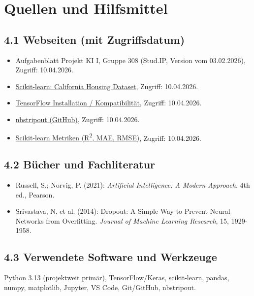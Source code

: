 \documentclass[11pt,a4paper,ngerman,openany]{report}
\begin{document}
\newpage

\section{Quellen und Hilfsmittel}

\small
\subsection*{4.1 Webseiten (mit Zugriffsdatum)}
\begin{itemize}[leftmargin=*,itemsep=0.05em,topsep=0.05em]
    \item [W1] Aufgabenblatt Projekt KI I, Gruppe 308 (Stud.IP, Version vom 03.02.2026), Zugriff: 10.04.2026.
    \item [W2] \href{https://scikit-learn.org/stable/modules/generated/sklearn.datasets.fetch_california_housing.html}{Scikit-learn: California Housing Dataset}, Zugriff: 10.04.2026.
    \item [W3] \href{https://www.tensorflow.org/install/pip}{TensorFlow Installation / Kompatibilit\"at}, Zugriff: 10.04.2026.
    \item [W4] \href{https://github.com/kynan/nbstripout}{nbstripout (GitHub)}, Zugriff: 10.04.2026.
    \item [W5] \href{https://scikit-learn.org/stable/modules/model_evaluation.html}{Scikit-learn Metriken (R\textsuperscript{2}, MAE, RMSE)}, Zugriff: 10.04.2026.
\end{itemize}

\subsection*{4.2 B\"ucher und Fachliteratur}
\begin{itemize}[leftmargin=*,itemsep=0.05em,topsep=0.05em]
    \item [L1] Russell, S.; Norvig, P. (2021): \textit{Artificial Intelligence: A Modern Approach}. 4th ed., Pearson.
    \item [L2] Srivastava, N. et al. (2014): Dropout: A Simple Way to Prevent Neural Networks from Overfitting. \textit{Journal of Machine Learning Research}, 15, 1929-1958.
\end{itemize}

\subsection*{4.3 Verwendete Software und Werkzeuge}
Python 3.13 (projektweit prim\"ar), TensorFlow/Keras, scikit-learn, pandas, numpy, matplotlib, Jupyter, VS Code, Git/GitHub, nbstripout.
\end{document}
